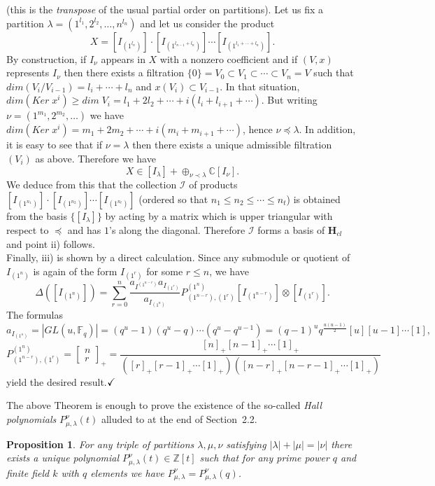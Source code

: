 \documentclass[a4paper,10pt]{amsart}
\def\Z{\mathbb{Z}}
\def\H{\mathbf{H}}
\def\qed{$\hfill \checkmark$}
\def\C{\mathbb{C}}
\newtheorem{prop}[theo]{Proposition}
\numberwithin{equation}{section}
\begin{document}
(this is the \textit{transpose} of the usual partial order on partitions). Let us fix a partition $\lambda=(1^{l_1}, 2^{l_2}, \ldots, n^{l_n})$ and let us consider the product
$$X=[I_{(1^{l_n})}] \cdot [I_{(1^{l_{n-1}+l_n})}] \cdots [I_{(1^{l_1+ \cdots + l_n})}].$$
By construction, if $I_{\nu}$ appears in $X$ with a nonzero coefficient and if $(V,x)$ represents $I_{\nu}$ then there exists a filtration $\{0\}=V_0 \subset V_1 \subset \cdots \subset V_n=V$ such that ${dim}(V_i/V_{i-1})=l_i+ \cdots + l_n$ and $x(V_i) \subset V_{i-1}$. In that situation, ${dim}({Ker}\;x^i) \geq {dim}\;V_i=l_1 + 2l_2 + \cdots + i(l_i + l_{i+1} + \cdots)$. But writing $\nu=(1^{m_1},2^{m_2}, \ldots)$ we have ${dim}({Ker}\;x^i)= m_1 + 2m_2 + \cdots + i(m_i + m_{i+1} + \cdots)$, hence $\nu \preceq \lambda$. In addition, it is easy to see that if $\nu=\lambda$ then there exists a unique admissible filtration $(V_i)$ as above. Therefore we have
$$X \in [I_{\lambda}] + \oplus_{\nu \prec \lambda} \C [I_{\nu}].$$
We deduce from this that the collection $\mathcal{I}$ of products $[I_{(1^{n_1})}] \cdot [I_{(1^{n_2})}] \cdots [I_{(1^{n_t})}]$ (ordered so that $n_1 \leq n_2 \leq \cdots \leq n_t$) is obtained from the basis $\{[I_{\lambda}]\}$ by acting by a matrix which is upper triangular with respect to $\preceq$ and has $1$'s along the diagonal. Therefore $\mathcal{I}$ forms a basis of $\H_{cl}$ and point ii) follows.\\
Finally, iii) is shown by a direct calculation. Since any submodule or quotient of $I_{(1^n)}$ is again of the form $I_{(1^r)}$ for some $r \leq n$, we have
$$\Delta([I_{(1^n)}])=\sum_{r =0}^n \frac{a_{I^{(1^{n-r})}} a_{I_{(1^r)}}}{a_{I_{(1^n)}}} P^{(1^n)}_{(1^{n-r}),(1^r)} [I_{(1^{n-r})}] \otimes [I_{(1^r)}].$$
The formulas
$$a_{I_{(1^u)}}=| GL(u,\mathbb{F}_q)|=(q^u-1)(q^u-q) \cdots (q^u-q^{u-1}) = (q-1)^u q^{\frac{u (u-1)}{2}} [u] [u-1] \cdots [1],$$
$$P^{(1^n)}_{(1^{n-r}),(1^r)}=\begin{bmatrix} n\\r \end{bmatrix}_+=\frac{[n]_+ [n-1]_+ \cdots [1]_+}{([r]_+ [r-1]_+ \cdots [1]_+) ([n-r]_+ [n-r-1]_+ \cdots [1]_+)}$$
yield the desired result.\qed

\vspace{.15in}

The above Theorem is enough to prove the existence of the so-called \textit{Hall polynomials} $P^{\nu}_{\mu,\lambda}(t)$ alluded to at the end of Section~2.2.

\begin{prop}\label{P:Hallpols} For any triple of partitions $\lambda,\mu,\nu$ satisfying $|\lambda|+|\mu|=|\nu|$ there exists a unique polynomial $P_{\mu,\lambda}^{\nu}(t) \in \Z[t]$ such that for any prime power $q$ and finite field $k$ with $q$ elements we have $P_{\mu,\lambda}^{\nu}=P_{\mu,\lambda}^{\nu}(q)$.\end{prop}
\end{document}
